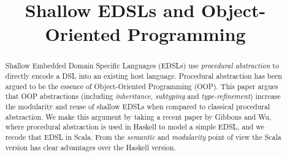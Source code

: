 \documentclass[10pt,preprint,numbers,nocopyrightspace]{sigplanconf}
\begin{document}
\setlength{\pdfpageheight}{\paperheight}
\setlength{\pdfpagewidth}{\paperwidth}




\title{Shallow EDSLs and Object-Oriented Programming}

\authorinfo{}
           {}
           {}

\maketitle

\begin{abstract}

Shallow Embedded Domain Specific Languages (EDSLs) use
\emph{procedural abstraction} to directly encode a DSL into an existing host language. Procedural abstraction has
been argued to be the essence of Object-Oriented Programming (OOP). 
This paper argues that OOP abstractions 
(including \emph{inheritance}, \emph{subtyping} and
\emph{type-refinement}) 
increase the modularity and reuse of shallow
EDSLs when compared to classical procedural abstraction. We make this
argument by taking a recent paper by Gibbons and Wu, where procedural
abstraction is used in Haskell to model a simple EDSL, and we recode
that EDSL in Scala. From the \emph{semantic}
and \emph{modularity} point of view the Scala version has clear advantages 
over the Haskell version. 

\end{abstract}
\end{document}
